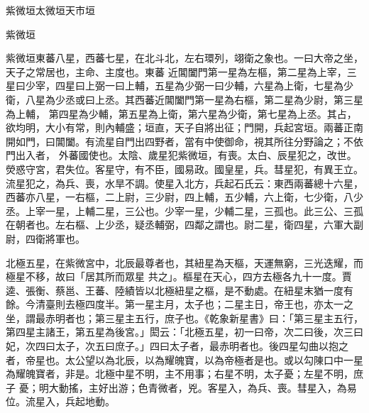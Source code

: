 
\begin{pinyinscope}

 紫微垣太微垣天市垣



 紫微垣



 紫微垣東蕃八星，西蕃七星，在北斗北，左右環列，翊衛之象也。一曰大帝之坐，天子之常居也，主命、主度也。東蕃
 近閶闔門第一星為左樞，第二星為上宰，三星曰少宰，四星曰上弼一曰上輔，五星為少弼一曰少輔，六星為上衛，七星為少衛，八星為少丞或曰上丞。其西蕃近閶闔門第一星為右樞，第二星為少尉，第三星為上輔，
 第四星為少輔，第五星為上衛，第六星為少衛，第七星為上丞。其占，欲均明，大小有常，則內輔盛；垣直，天子自將出征；門開，兵起宮垣。兩蕃正南開如門，曰閶闔。有流星自門出四野者，當有中使御命，視其所往分野論之；不依門出入者，
 外蕃國使也。太陰、歲星犯紫微垣，有喪。太白、辰星犯之，改世。熒惑守宮，君失位。客星守，有不臣，國易政。國皇星，兵。彗星犯，有異王立。流星犯之，為兵、喪，水旱不調。使星入北方，兵起石氏云：東西兩蕃總十六星，西蕃亦八星，一右樞，二上尉，三少尉，四上輔，五少輔，六上衛，七少衛，八少丞。上宰一星，上輔二星，三公也。少宰一星，少輔二星，三孤也。此三公、三孤在朝者也。左右樞、上少丞，疑丞輔弼，四鄰之謂也。尉二星，衛四星，六軍大副尉，四衛將軍也。



 北極五星，在紫微宮中，北辰最尊者也，其紐星為天樞，天運無窮，三光迭耀，而極星不移，故曰「居其所而眾星
 共之」。樞星在天心，四方去極各九十一度。賈逵、張衡、蔡邕、王蕃、陸績皆以北極紐星之樞，是不動處。在紐星末猶一度有餘。今清臺則去極四度半。第一星主月，太子也；二星主日，帝王也，亦太一之坐，謂最赤明者也；第三星主五行，庶子也。《乾象新星書》曰：「第三星主五行，第四星主諸王，第五星為後宮。」閎云：「北極五星，初一曰帝，次二曰後，次三曰妃，次四曰太子，次五曰庶子。」四曰太子者，最赤明者也。後四星勾曲以抱之者，帝星也。太公望以為北辰，以為耀魄寶，以為帝極者是也。或以勾陳口中一星為耀魄寶者，非是。北極中星不明，主不用事；右星不明，太子憂；左星不明，庶子
 憂；明大動搖，主好出游；色青微者，兇。客星入，為兵、喪。彗星入，為易位。流星入，兵起地動。




\end{pinyinscope}
